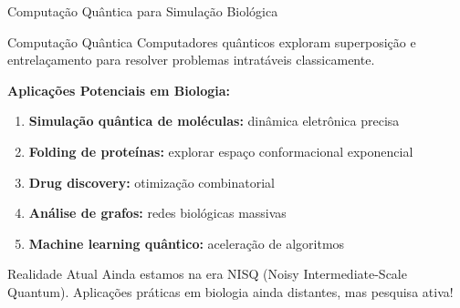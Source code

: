 \begin{frame}{Computação Quântica para Simulação Biológica}
\begin{block}{Computação Quântica}
Computadores quânticos exploram superposição e entrelaçamento para resolver problemas intratáveis classicamente.
\end{block}

\textbf{Aplicações Potenciais em Biologia:}
\begin{enumerate}
    \item \textbf{Simulação quântica de moléculas:} dinâmica eletrônica precisa
    \item \textbf{Folding de proteínas:} explorar espaço conformacional exponencial
    \item \textbf{Drug discovery:} otimização combinatorial
    \item \textbf{Análise de grafos:} redes biológicas massivas
    \item \textbf{Machine learning quântico:} aceleração de algoritmos
\end{enumerate}

\vspace{0.3cm}

\begin{alertblock}{Realidade Atual}
Ainda estamos na era NISQ (Noisy Intermediate-Scale Quantum). Aplicações práticas em biologia ainda distantes, mas pesquisa ativa!
\end{alertblock}
\end{frame}

